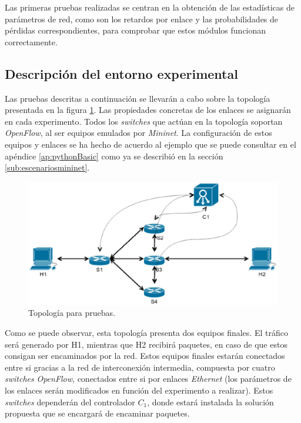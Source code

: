 \documentclass[a4paper,11pt]{book}
\begin{document}
Las primeras pruebas realizadas se centran en la obtención de las estadísticas de parámetros de red, como son los retardos por enlace y las probabilidades de pérdidas correspondientes, para comprobar que estos módulos funcionan correctamente. 

%
\subsection{Descripción del entorno experimental}

 Las pruebas descritas a continuación se llevarán a cabo sobre la topología presentada en la figura \ref{topo}. Las propiedades concretas de los enlaces se asignarán en cada experimento. Todos los \emph{switches} que actúan en la topología soportan \emph{OpenFlow}, al ser equipos emulados por \emph{Mininet}. La configuración de estos equipos y enlaces se ha hecho de acuerdo al ejemplo que se puede consultar en el apéndice \ref{ap:pythonBasic} como ya se describió en la sección \ref{sub:escenariosmininet}.
\begin{figure}[tb]
\centering
\includegraphics[scale=0.7]{./figuras/topoBasic}
\caption{Topología para pruebas.}\label{topo}
\end{figure}


Como se puede observar, esta topología presenta dos equipos finales. El tráfico será generado por H1, mientras que H2 recibirá paquetes, en caso de que estos consigan ser encaminados por la red. Estos equipos finales estarán conectados entre si gracias a la red de interconexión intermedia, compuesta por cuatro \emph{switches} \emph{OpenFlow}, conectados entre si por enlaces \emph{Ethernet} (los parámetros de los enlaces serán modificados en función del experimento a realizar). Estos \emph{switches} dependerán del controlador $C_{1}$, donde estará instalada la solución propuesta que se encargará de encaminar paquetes.
\end{document}
